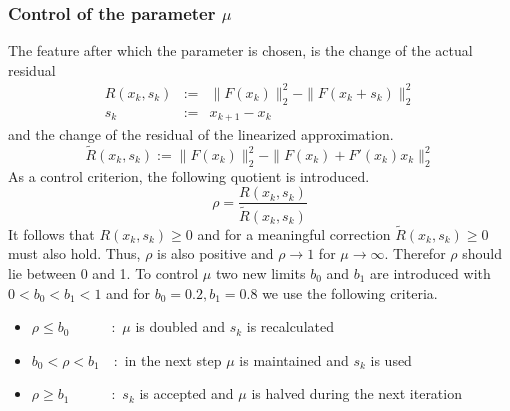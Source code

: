 \documentclass[letterpaper,10pt,english]{sphinxmanual}
\begin{document}
\subsubsection{Control of the parameter \(\mu\)}
\label{guide/background:control-of-the-parameter}
The feature after which the parameter is chosen, is the change of the actual residual
\begin{eqnarray*}
   R(x_k, s_k) & := & \| F(x_k) \|_2^2 - \| F(x_k + s_k) \|_2^2 \\
   s_k         & := & x_{k+1} - x_k
\end{eqnarray*}
and the change of the residual of the linearized approximation.
\begin{equation*}
   \tilde{R}(x_k, s_k) := \| F(x_k) \|_2^2 - \| F(x_k) + F'(x_k)x_k \|_2^2
\end{equation*}
As a control criterion, the following quotient is introduced.
\begin{equation*}
   \rho = \frac{R(x_k, s_k)}{\tilde{R}(x_k, s_k)}
\end{equation*}
It follows that \(R(x_k,s_k) \geq 0\) and for a meaningful correction \(\tilde{R}(x_k, s_k) \geq 0\) must also hold.
Thus, \(\rho\) is also positive and \(\rho \rightarrow 1\) for \(\mu \rightarrow \infty\).
Therefor \(\rho\) should lie between 0 and 1. To control \(\mu\) two new limits \(b_0\) and \(b_1\) are introduced
with \(0 < b_0 < b_1 < 1\) and for \(b_0 = 0.2, b_1 = 0.8\) we use the following criteria.
\begin{itemize}
\item {} 
\(\rho \leq b_0 \qquad\quad :\) \(\mu\) is doubled and \(s_k\) is recalculated

\item {} 
\(b_0 < \rho < b_1 \quad :\) in the next step \(\mu\) is maintained and \(s_k\) is used

\item {} 
\(\rho \geq b_1 \qquad\quad :\) \(s_k\) is accepted and \(\mu\) is halved during the next iteration

\end{itemize}
\end{document}
